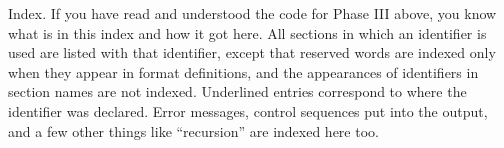 Index.
If you have read and understood the code for Phase III above, you know what
is in this index and how it got here. All sections in which an identifier is
used are listed with that identifier, except that reserved words are
indexed only when they appear in format definitions, and the appearances
of identifiers in section names are not indexed. Underlined entries
correspond to where the identifier was declared. Error messages, control
sequences put into the output, and a few
other things like ``recursion'' are indexed here too.
\fi

\inx
\fin
\con

